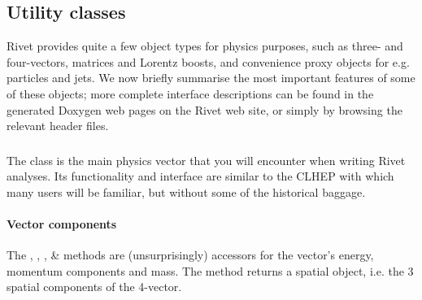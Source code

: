 \documentclass{JHEP3}
\begin{document}



\subsection{Utility classes}

Rivet provides quite a few object types for physics purposes, such as three- and
four-vectors, matrices and Lorentz boosts, and convenience proxy objects for
e.g. particles and jets. We now briefly summarise the most important features of
some of these objects; more complete interface descriptions can be found in the
generated Doxygen web pages on the Rivet web site, or simply by browsing the
relevant header files.

\subsubsection{}

The  class is the main physics vector that you will encounter
when writing Rivet analyses. Its functionality and interface are similar to the
CLHEP  with which many users will be familiar, but
without some of the historical baggage.

\paragraph{Vector components}%
The  , , ,  \&
 methods are (unsurprisingly) accessors for the vector's energy,
momentum components and mass. The  method returns a spatial
 object, i.e. the 3 spatial components of the 4-vector.
\end{document}
